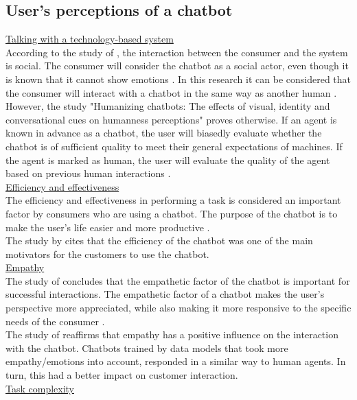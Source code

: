 \subsection{User’s perceptions of a chatbot}
\ul{Talking with a technology-based system}\\
According to the study of \citeauthor{Adam2021}, the interaction between the consumer and the system is social. The consumer will consider the chatbot as a social actor, even though it is known that it cannot show emotions \citep{Adam2021}. In this research it can be considered that the consumer will interact with a chatbot in the same way as another human \citep{Cheng2021,Ischen2020}.\\
However, the study "Humanizing chatbots: The effects of visual, identity and conversational cues on humanness perceptions" proves otherwise. If an agent is known in advance as a chatbot, the user will biasedly evaluate whether the chatbot is of sufficient quality to meet their general expectations of machines. If the agent is marked as human, the user will evaluate the quality of the agent based on previous human interactions \citep{Go2019,Shyam2008}.\\
\break
\ul{Efficiency and effectiveness}\\
The efficiency and effectiveness in performing a task is considered an important factor by consumers who are using a chatbot. The purpose of the chatbot is to make the user's life easier and more productive \citep{Brandtzaeg2018}.\\
The study by \citeauthor{Skjuve2019} cites that the efficiency of the chatbot was one of the main motivators for the customers to use the chatbot.\citep{Skjuve2019}\\
\break
\ul{Empathy}\\
The study of \citeauthor{Cheng2021} concludes that the empathetic factor of the chatbot is important for successful interactions. The empathetic factor of a chatbot makes the user's perspective more appreciated, while also making it more responsive to the specific needs of the consumer \citep{Cheng2021}.\\
The study of \citeauthor{Agarwal2021} reaffirms that empathy has a positive influence on the interaction with the chatbot. Chatbots trained by data models that took more empathy/emotions into account, responded in a similar way to human agents. In turn, this had a better impact on customer interaction. \citep{Agarwal2021}\\
\break
\ul{Task complexity}\\
